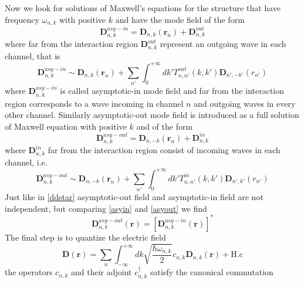 \documentclass[12pt]{book}
\renewcommand{\r}{\mathbf{r}}
\begin{document}
Now we look for solutions of Maxwell's equations for the structure that have frequency $\omega_{n,k}$ with positive $k$ and have the mode field of the form
\begin{equation}\mathbf{D}^{asy-in}_{n,k} =\mathbf{D}_{n,k}(\r_n) + \mathbf{D}^{out}_{n,k}\end{equation}
where far from the interaction region $\mathbf{D}^{out}_{n,k}$ represent an outgoing wave in each channel, that is
\begin{equation}\label{asyin}\mathbf{D}^{asy-in}_{n,k} \sim \mathbf{D}_{n,k}(\r_n) + \sum_{n'}\int_{0}^{+\infty}dk' T^{out}_{n,n'}(k,k')\mathbf{D}_{n',-k'}(r_{n'})\end{equation}
where $\mathbf{D}^{asy-in}_{n,k}$ is called asymptotic-in mode field and far from the interaction region corresponds to a wave incoming in channel $n$ and outgoing waves in every other channel. %
Similarly asymptotic-out mode field is introduced as a full solution of Maxwell equation with positive $k$ and of the form
\begin{equation}\mathbf{D}^{asy-out}_{n,k} =\mathbf{D}_{n,-k}(\r_n) + \mathbf{D}^{in}_{n,k}\end{equation}
where $\mathbf{D}^{in}_{n,k}$ far from the interaction region consist of incoming waves in each channel, i.e.
\begin{equation}\label{asyout}\mathbf{D}^{asy-out}_{n,k} \sim \mathbf{D}_{n,-k}(\r_n) + \sum_{n'}\int_{0}^{+\infty}dk' T^{in}_{n,n'}(k,k')\mathbf{D}_{n',k'}(r_{n'})\end{equation} 
Just like in \eqref{ddstar} asymptotic-out field and asymptotic-in field are not independent, but comparing \eqref{asyin} and \eqref{asyout} we find
\begin{equation}\mathbf{D}^{asy-out}_{n,k}(\r) = [\mathbf{D}^{asy-in}_{n,k}(\r)]^*\end{equation}
The final step is to quantize the electric field 
\begin{equation}\mathbf{D}(\r) = \sum_n \int_{-\infty}^{+\infty}dk \sqrt{\frac{\hbar \omega_{n,k}}{2}}c_{n,k}\mathbf{D}_{n,k}(\r) + \text{H.c}\end{equation}
the operators $c_{n,k}$ and their adjoint $c_{n,k}^\dagger$ satisfy the canonical commutation
\end{document}
